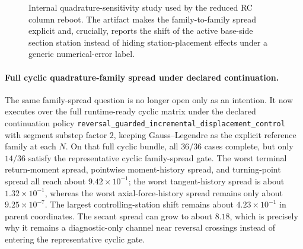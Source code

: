 \begin{figure}[htbp]
  \centering
  \caption{Internal quadrature-sensitivity study used by the reduced RC
  column reboot. The artifact makes the family-to-family spread explicit and,
  crucially, reports the shift of the active base-side section station instead
  of hiding station-placement effects under a generic numerical-error label.}
  \label{fig:reduced-rc-column-quadrature-sensitivity-study}
\end{figure}

\paragraph{Full cyclic quadrature-family spread under declared continuation.}
The same family-spread question is no longer open only as an intention.  It
now executes over the full runtime-ready cyclic matrix under the declared
continuation policy
\texttt{reversal\_guarded\_incremental\_displacement\_control} with segment
substep factor \(2\), keeping Gauss--Legendre as the explicit reference family
at each \(N\).  On that full cyclic bundle, all \(36/36\) cases complete, but
only \(14/36\) satisfy the representative cyclic family-spread gate.  The
worst terminal return-moment spread, pointwise moment-history spread, and
turning-point spread all reach about \(9.42\times 10^{-1}\); the worst
tangent-history spread is about \(1.32\times 10^{-1}\), whereas the worst
axial-force-history spread remains only about \(9.25\times 10^{-7}\).  The
largest controlling-station shift remains about \(4.23\times 10^{-1}\) in
parent coordinates.  The secant spread can grow to about \(8.18\), which is
precisely why it remains a diagnostic-only channel near reversal crossings
instead of entering the representative cyclic gate.

